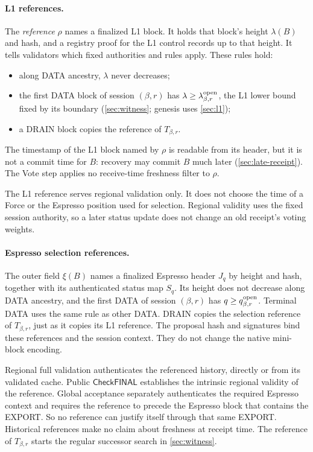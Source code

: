\documentclass[11pt,a4paper]{article}
\newcommand{\tagg}[1]{\ensuremath{\mathsf{#1}}}
\newcommand{\defterm}[1]{\textcolor{rrBlue}{\textit{#1}}}
\begin{document}
\paragraph{L1 references.}
The \defterm{reference} $\rho$ names a finalized L1 block. It holds that
block's height $\lambda(B)$ and hash, and a registry proof for the L1
control records up to that height. It tells validators which fixed
authorities and rules apply. These rules hold:
\begin{itemize}
\item along DATA ancestry, $\lambda$ never decreases;
\item the first DATA block of session $(\beta,r)$ has $\lambda\ge
\lambda^{\rm open}_{\beta,r}$, the L1 lower bound fixed by its boundary
(\cref{sec:witness}; genesis uses \cref{sec:l1});
\item a DRAIN block copies the reference of $T_{\beta,r}$.
\end{itemize}
The timestamp of the L1 block named by $\rho$ is readable from its
header, but it is not a commit time for $B$: recovery may commit $B$
much later (\cref{sec:late-receipt}). The Vote step applies no
receive-time freshness filter to $\rho$.

The L1 reference serves regional validation only. It does not choose
the time of a Force or the Espresso position used for selection.
Regional validity uses the fixed session authority, so a later status
update does not change an old receipt's voting weights.

\paragraph{Espresso selection references.}
The outer field $\xi(B)$ names a finalized Espresso header $J_q$ by
height and hash, together with its authenticated status map $S_q$.
Its height does not
decrease along DATA ancestry, and the first DATA of session $(\beta,r)$
has $q\ge q_{\beta,r}^{\rm open}$. Terminal DATA uses the same rule as
other DATA. DRAIN copies the selection reference of $T_{\beta,r}$, just
as it copies its L1 reference. The proposal hash and signatures bind
these references and the session context. They do not change the native
mini-block encoding.

Regional full validation authenticates the referenced history, directly
or from its validated cache. Public \tagg{CheckFINAL} establishes the
intrinsic regional validity of the reference. Global acceptance
separately authenticates the required Espresso context and requires the
reference to precede the Espresso block that contains the EXPORT. So no
reference can justify itself through that same EXPORT. Historical
references make no claim about freshness at receipt time. The reference
of $T_{\beta,r}$ starts the regular successor search in \cref{sec:witness}.
\end{document}
